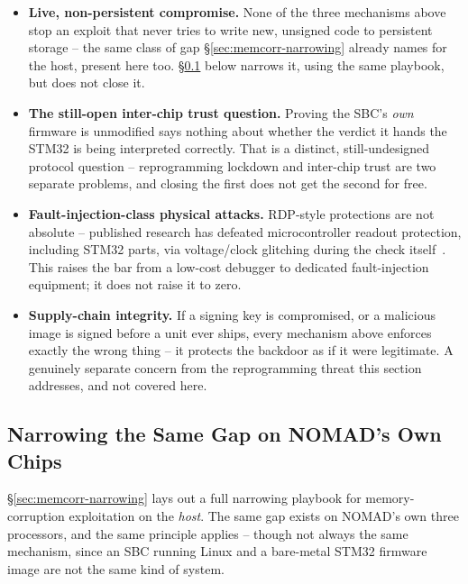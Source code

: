\documentclass[11pt,a4paper]{article}
\begin{document}
\begin{notebox}
\begin{itemize}
  \item \textbf{Live, non-persistent compromise.} None of the three
    mechanisms above stop an exploit that never tries to write new,
    unsigned code to persistent storage -- the same class of gap
    \S\ref{sec:memcorr-narrowing} already names for the host, present
    here too. \S\ref{sec:reprogram-memcorr} below narrows it, using the
    same playbook, but does not close it.
  \item \textbf{The still-open inter-chip trust question.} Proving the
    SBC's \emph{own} firmware is unmodified says nothing about whether
    the verdict it hands the STM32 is being interpreted correctly. That
    is a distinct, still-undesigned protocol question -- reprogramming
    lockdown and inter-chip trust are two separate problems, and
    closing the first does not get the second for free.
  \item \textbf{Fault-injection-class physical attacks.} RDP-style
    protections are not absolute -- published research has defeated
    microcontroller readout protection, including STM32 parts, via
    voltage/clock glitching during the check itself~\cite{obermaier2021}.
    This raises the bar from a low-cost debugger to dedicated
    fault-injection equipment; it does not raise it to zero.
  \item \textbf{Supply-chain integrity.} If a signing key is
    compromised, or a malicious image is signed before a unit ever
    ships, every mechanism above enforces exactly the wrong thing -- it
    protects the backdoor as if it were legitimate. A genuinely
    separate concern from the reprogramming threat this section
    addresses, and not covered here.
\end{itemize}
\end{notebox}

\subsection{Narrowing the Same Gap on NOMAD's Own Chips}
\label{sec:reprogram-memcorr}

\S\ref{sec:memcorr-narrowing} lays out a full narrowing playbook for
memory-corruption exploitation on the \emph{host}. The same gap exists
on NOMAD's own three processors, and the same principle applies --
though not always the same mechanism, since an SBC running Linux and a
bare-metal STM32 firmware image are not the same kind of system.
\end{document}
